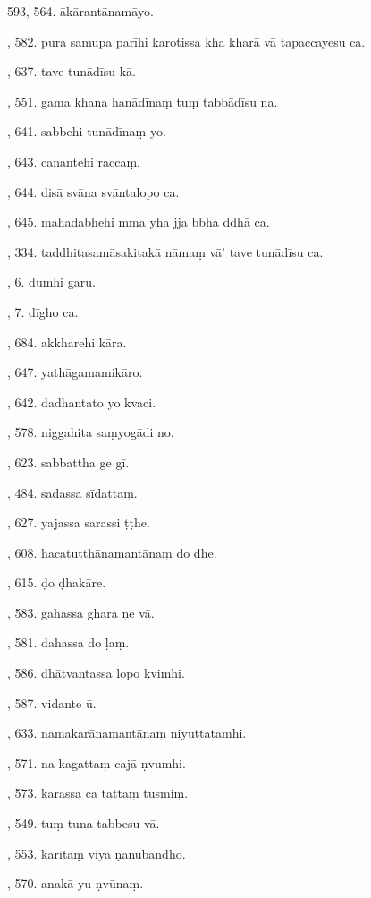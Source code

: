 593, 564. ākārantānamāyo.\par {}, 582. pura samupa parīhi karotissa kha kharā vā tapaccayesu ca.\par {}, 637. tave tunādīsu kā.\par {}, 551. gama khana hanādīnaṃ tuṃ tabbādīsu na.\par {}, 641. sabbehi tunādīnaṃ yo.\par {}, 643. canantehi raccaṃ.\par {}, 644. disā svāna svāntalopo ca.\par {}, 645. mahadabhehi mma yha jja bbha ddhā ca.\par {}, 334. taddhitasamāsakitakā nāmaṃ vā’ tave tunādīsu ca.\par {}, 6. dumhi garu.\par {}, 7. dīgho ca.\par {}, 684. akkharehi kāra.\par {}, 647. yathāgamamikāro.\par {}, 642. dadhantato yo kvaci.\par {}, 578. niggahita saṃyogādi no.\par {}, 623. sabbattha ge gī.\par {}, 484. sadassa sīdattaṃ.\par {}, 627. yajassa sarassi ṭṭhe.\par {}, 608. hacatutthānamantānaṃ do dhe.\par {}, 615. ḍo ḍhakāre.\par {}, 583. gahassa ghara ṇe vā.\par {}, 581. dahassa do ḷaṃ.\par {}, 586. dhātvantassa lopo kvimhi.\par {}, 587. vidante ū.\par {}, 633. namakarānamantānaṃ niyuttatamhi.\par {}, 571. na kagattaṃ cajā ṇvumhi.\par {}, 573. karassa ca tattaṃ tusmiṃ.\par {}, 549. tuṃ tuna tabbesu vā.\par {}, 553. kāritaṃ viya ṇānubandho.\par {}, 570. anakā yu-ṇvūnaṃ.\par \noindent
